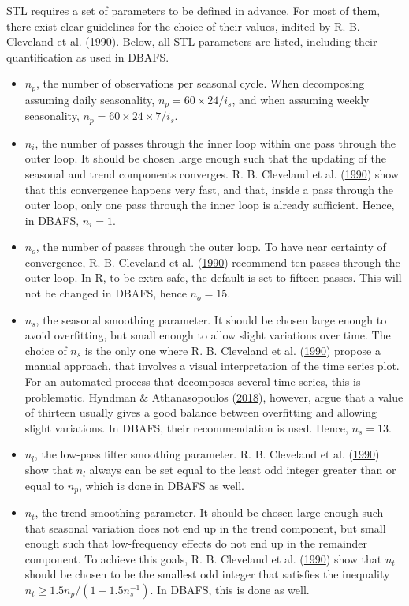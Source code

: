 \documentclass[12pt,oneside]{reedthesis}
\providecommand{\tightlist}{%
  \setlength{\itemsep}{0pt}\setlength{\parskip}{0pt}}
\begin{document}
STL requires a set of parameters to be defined in advance. For most of
them, there exist clear guidelines for the choice of their values,
indited by R. B. Cleveland et al.
(\protect\hyperlink{ref-cleveland1990}{1990}). Below, all STL parameters
are listed, including their quantification as used in DBAFS.
\begin{itemize}
\tightlist
\item
  \(n_{p}\), the number of observations per seasonal cycle. When
  decomposing assuming daily seasonality,
  \(n_{p} = 60 \times 24 / i_{s}\), and when assuming weekly
  seasonality, \(n_{p} = 60 \times 24 \times 7 / i_{s}\).
\item
  \(n_{i}\), the number of passes through the inner loop within one pass
  through the outer loop. It should be chosen large enough such that the
  updating of the seasonal and trend components converges. R. B.
  Cleveland et al. (\protect\hyperlink{ref-cleveland1990}{1990}) show
  that this convergence happens very fast, and that, inside a pass
  through the outer loop, only one pass through the inner loop is
  already sufficient. Hence, in DBAFS, \(n_{i} = 1\).
\item
  \(n_{o}\), the number of passes through the outer loop. To have near
  certainty of convergence, R. B. Cleveland et al.
  (\protect\hyperlink{ref-cleveland1990}{1990}) recommend ten passes
  through the outer loop. In R, to be extra safe, the default is set to
  fifteen passes. This will not be changed in DBAFS, hence
  \(n_{o} = 15\).
\item
  \(n_{s}\), the seasonal smoothing parameter. It should be chosen large
  enough to avoid overfitting, but small enough to allow slight
  variations over time. The choice of \(n_{s}\) is the only one where R.
  B. Cleveland et al. (\protect\hyperlink{ref-cleveland1990}{1990})
  propose a manual approach, that involves a visual interpretation of
  the time series plot. For an automated process that decomposes several
  time series, this is problematic. Hyndman \& Athanasopoulos
  (\protect\hyperlink{ref-hyndman2018fpp}{2018}), however, argue that a
  value of thirteen usually gives a good balance between overfitting and
  allowing slight variations. In DBAFS, their recommendation is used.
  Hence, \(n_{s} = 13\).
\item
  \(n_{l}\), the low-pass filter smoothing parameter. R. B. Cleveland et
  al. (\protect\hyperlink{ref-cleveland1990}{1990}) show that \(n_{l}\)
  always can be set equal to the least odd integer greater than or equal
  to \(n_{p}\), which is done in DBAFS as well.
\item
  \(n_{t}\), the trend smoothing parameter. It should be chosen large
  enough such that seasonal variation does not end up in the trend
  component, but small enough such that low-frequency effects do not end
  up in the remainder component. To achieve this goals, R. B. Cleveland
  et al. (\protect\hyperlink{ref-cleveland1990}{1990}) show that
  \(n_{t}\) should be chosen to be the smallest odd integer that
  satisfies the inequality \(n_{t} \geq 1.5n_{p} / (1-1.5n_{s}^{-1})\).
  In DBAFS, this is done as well.
\end{itemize}
\end{document}
